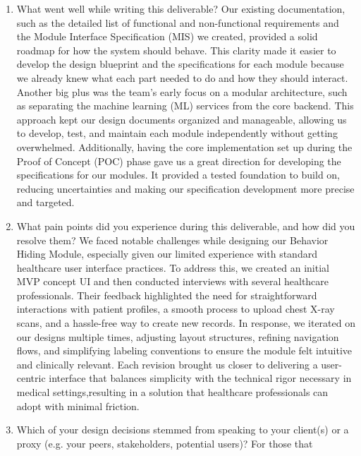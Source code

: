 \documentclass[12pt, titlepage]{article}
\begin{document}
\begin{enumerate}
  \item What went well while writing this deliverable? 
  \newline\newline 
  Our existing documentation, such as the detailed list of functional and non-functional requirements and the Module Interface Specification (MIS) we created, provided a solid roadmap for how the system should behave. This clarity made it easier to develop the design blueprint and the specifications for each module because we already knew what each part needed to do and how they should interact. Another big plus was the team’s early focus on a modular architecture, such as separating the machine learning (ML) services from the core backend. This approach kept our design documents organized and manageable, allowing us to develop, test, and maintain each module independently without getting overwhelmed. Additionally, having the core implementation set up during the Proof of Concept (POC) phase gave us a great direction for developing the specifications for our modules. It provided a tested foundation to build on, reducing uncertainties and making our specification development more precise and targeted.
  \item What pain points did you experience during this deliverable, and how
    did you resolve them?
    \newline\newline
    We faced notable challenges while designing our Behavior Hiding Module, especially given our limited experience with standard healthcare user interface practices. To address this, we created an initial MVP concept UI and then conducted interviews with several healthcare professionals. Their feedback highlighted the need for straightforward interactions with patient profiles, a smooth process to upload chest X-ray scans, and a hassle-free way to create new records. In response, we iterated on our designs multiple times, adjusting layout structures, refining navigation flows, and simplifying labeling conventions to ensure the module felt intuitive and clinically relevant. Each revision brought us closer to delivering a user-centric interface that balances simplicity with the technical rigor necessary in medical settings,resulting in a solution that healthcare professionals can adopt with minimal friction.
  \item Which of your design decisions stemmed from speaking to your client(s)
  or a proxy (e.g. your peers, stakeholders, potential users)? For those that

\end{enumerate}
\end{document}

